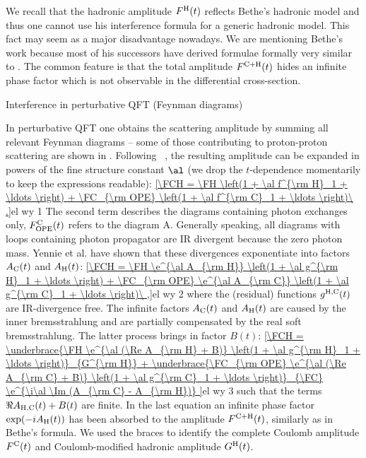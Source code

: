 We recall that the hadronic amplitude $F^{\rm H}(t)$ reflects Bethe's hadronic model and thus one cannot use his interference formula for a generic hadronic model. This fact may seem as a major disadvantage nowadays. We are mentioning Bethe's work because most of his successors have derived formulae formally very similar to . The common feature is that the total amplitude $F^{\rm C+H}(t)$ hides an infinite phase factor which is not observable in the differential cross-section.


\caption{Interference in perturbative QFT (Feynman diagrams)}



In perturbative QFT one obtains the scattering amplitude by summing all relevant Feynman diagrams -- some of those contributing to proton-proton scattering are shown in . Following \WaY\ , the resulting amplitude can be expanded in powers of the fine structure constant $\al$ (we drop the $t$-dependence momentarily to keep the expressions readable):
\eqref{\FCH = \FH \left(1 + \al f^{\rm H}_1 + \ldots \right) + \FC_{\rm OPE} \left(1 + \al f^{\rm C}_1 + \ldots \right)\ .}{el wy 1}
The second term describes the diagrams containing photon exchanges only, $F^{\rm C}_{\rm OPE}(t)$ refers to the diagram  A. Generally speaking, all diagrams with loops containing photon propagator are IR divergent because the zero photon mass. Yennie et al.  have shown that these divergences exponentiate into factors $A_{\rm C}(t)$ and $A_{\rm H}(t)$:
\eqref{\FCH = \FH \e^{\al A_{\rm H}} \left(1 + \al g^{\rm H}_1 + \ldots \right) + \FC_{\rm OPE} \e^{\al A_{\rm C}} \left(1 + \al g^{\rm C}_1 + \ldots \right)\ ,}{el wy 2}
where the (residual) functions $g^{\rm H, C}(t)$ are IR-divergence free. The infinite factors $A_{\rm C}(t)$ and $A_{\rm H}(t)$ are caused by the inner bremsstrahlung and are partially compensated by the real soft bremsstrahlung. The latter process brings in factor $B(t)$:
\eqref{\FCH =
\underbrace{\FH \e^{\al (\Re A_{\rm H} + B)} \left(1 + \al g^{\rm H}_1 + \ldots \right)}_{G^{\rm H}}
+
\underbrace{\FC_{\rm OPE} \e^{\al (\Re A_{\rm C} + B)} \left(1 + \al g^{\rm C}_1 + \ldots \right)}_{\FC}
\e^{\i\al \Im (A_{\rm C} - A_{\rm H})}
}{el wy 3}
such that the terms $\Re A_{\rm H, C}(t) + B(t)$ are finite. In the last equation an infinite phase factor $\exp(-iA_{\rm H}(t))$ has been absorbed to the amplitude $F^{\rm C+H}(t)$, similarly as in Bethe's formula. We used the braces to identify the complete Coulomb amplitude $F^{\rm C}(t)$ and Coulomb-modified hadronic amplitude $G^{\rm H}(t)$.

